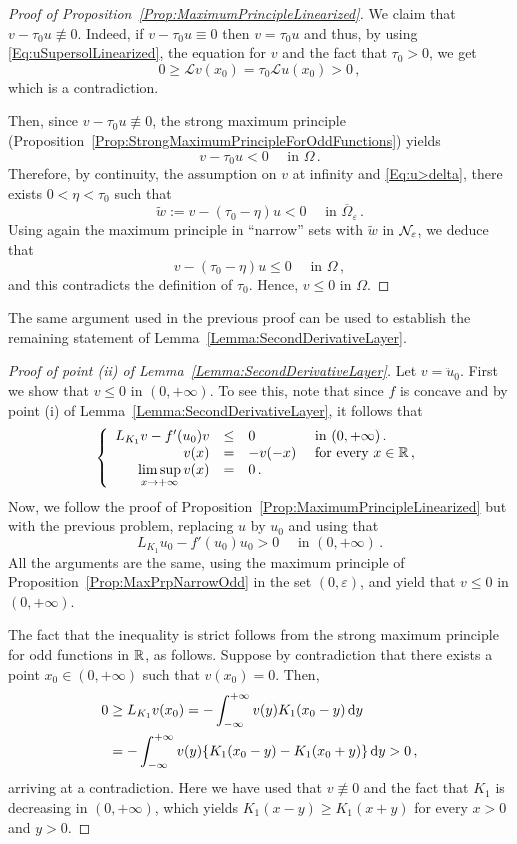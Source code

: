 \begin{proof}[Proof of Proposition~\ref{Prop:MaximumPrincipleLinearized}]
	We claim that $v - \tau_0 u \not \equiv 0$. Indeed, if $v - \tau_0 u \equiv 0$ then $v = \tau_0 u$ and thus, by using \eqref{Eq:uSupersolLinearized}, the equation for $v$ and the fact that $\tau_0 > 0$, we get 
	$$
	0 \geq \mathscr{L} v(x_0) = \tau_0 \mathscr{L} u(x_0) > 0\,, 
	$$
	which is a contradiction.
	
	Then, since $v - \tau_0 u \not \equiv 0$, the strong maximum principle (Proposition~\ref{Prop:StrongMaximumPrincipleForOddFunctions}) yields
	$$
	v - \tau_0 u < 0 \quad \textrm{ in }\Omega\,.
	$$
	Therefore, by continuity, the assumption on $v$ at infinity and \eqref{Eq:u>delta}, there exists $0 < \eta <\tau_0$ such that 
	$$
	\tilde{w} := v - (\tau_0 - \eta) u < 0 \quad \textrm{ in }\overline{\Omega}_\varepsilon\,.
	$$
	Using again the maximum principle in ``narrow'' sets with $\tilde{w}$ in $\mathcal{N}_\varepsilon$, we deduce that 
	$$
	v - (\tau_0 - \eta) u \leq 0 \quad \textrm{ in }\Omega\,,
	$$
	and this contradicts the definition of $\tau_0$. Hence, $v\leq 0$ in $\Omega$.
\end{proof}


The same argument used in the previous proof can be used to establish the remaining statement of Lemma~\ref{Lemma:SecondDerivativeLayer}.

\begin{proof}[Proof of point (ii) of Lemma~\ref{Lemma:SecondDerivativeLayer}]
	
	Let $v = \ddot{u}_0$. First we show that $v\leq 0$ in $(0,+\infty)$. To see this, note that since $f$ is concave and by point (i) of Lemma~\ref{Lemma:SecondDerivativeLayer}, it follows that
	$$
	\left\{\begin{array}{rcll}
	L_{K_1} v - f'(u_0)v &\leq &0 & \text{ in } (0,+\infty)\,.\\
	v(x) &= &-v(-x) & \text{ for every } x\in \mathbb{R}\,,\\
	\displaystyle \limsup_{x\to +\infty} v(x) &= & 0\,.
	\end{array} \right.
	$$
	Now, we follow the proof of Proposition~\ref{Prop:MaximumPrincipleLinearized} but with the previous problem, replacing $u$ by $u_0$ and using that
	$$
	L_{K_1} u_0 - f'(u_0)u_0 > 0 \quad \text{ in } (0,+\infty)\,. 
	$$
	All the arguments are the same, using the maximum principle of Proposition~\ref{Prop:MaxPrpNarrowOdd} in the set $(0,\varepsilon)$, and yield that $v\leq 0$ in $(0,+\infty)$.
	
	The fact that the inequality is strict follows from the strong maximum principle for odd functions in $\mathbb{R}$, as follows. Suppose by contradiction that there exists a point $x_0\in (0,+\infty)$ such that $v(x_0) = 0$. Then,
	\begin{align*}
		0 &\geq L_{K_1} v (x_0) = - \int_{-\infty}^{+\infty}	v(y) K_1(x_0 - y) \,\mathrm{d} y \\
		&= - \int_{-\infty}^{+\infty} v(y) \{ K_1(x_0 - y) - K_1(x_0 + y)\} \,\mathrm{d} y > 0\,,
	\end{align*}
	arriving at a contradiction. Here we have used that $v\not \equiv 0$ and the fact that $K_1$ is decreasing in $(0,+\infty)$, which yields $K_1(x - y) \geq  K_1(x + y)$ for every $x>0$ and $y>0$.
\end{proof}






